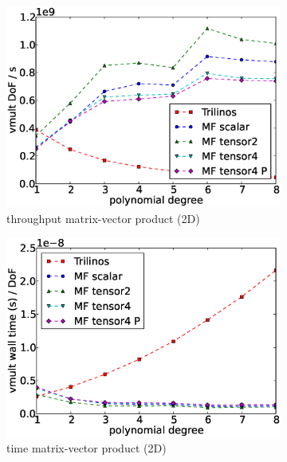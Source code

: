 \documentclass[AMA,STIX1COL]{WileyNJD-v2}
\begin{document}
\begin{figure}
  \centering
  \begin{subfigure}[b]{0.32\textwidth}
      \centering
      \includegraphics[width=\textwidth]{CSL_Munich_throughput2d.eps}
      \caption{throughput matrix-vector product (2D)}
  \end{subfigure}
  \begin{subfigure}[b]{0.32\textwidth}
      \centering
      \includegraphics[width=\textwidth]{CSL_Munich_timing2d.eps}
      \caption{time matrix-vector product (2D)}
      \label{fig:benchmark_miehe_CSL_vmult2}
  \end{subfigure}
  \begin{subfigure}[b]{0.32\textwidth}
      \centering

\end{subfigure}
\end{figure}
\end{document}
